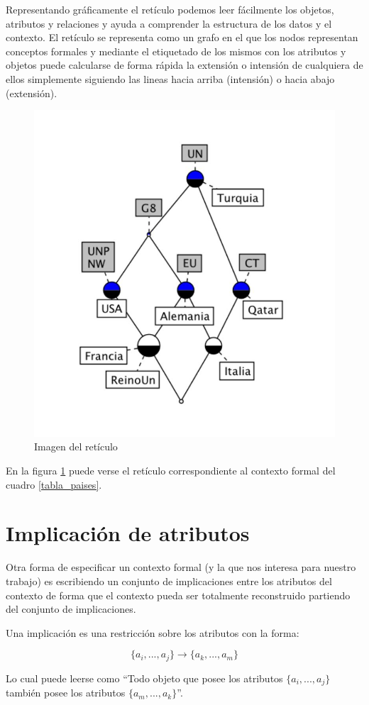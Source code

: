 	Representando gráficamente el retículo podemos leer fácilmente los objetos, atributos y relaciones y ayuda a comprender la estructura de los datos y el contexto. El retículo se representa como un grafo en el que los nodos representan conceptos formales y mediante el etiquetado de los mismos con los atributos y objetos puede calcularse de forma rápida la extensión o intensión de cualquiera de ellos simplemente siguiendo las lineas hacia arriba (intensión) o hacia abajo (extensión).
	
	\begin{figure}
		\centering
		\includegraphics[width=0.5\linewidth]{02_FCA/reticulo}
		\caption{Imagen del retículo}
		\label{reticulo}
	\end{figure}

	En la figura \ref{reticulo} puede verse el retículo correspondiente al contexto formal del cuadro \ref{tabla_paises}.
	
	
	
\section*{Implicación de atributos}

	Otra forma de especificar un contexto formal (y la que nos interesa para nuestro trabajo) es escribiendo un conjunto de implicaciones entre los atributos del contexto de forma que el contexto pueda ser totalmente reconstruido partiendo del conjunto de implicaciones.
	
	Una implicación es una restricción sobre los atributos con la forma: 
	
	\[ \{a_i,...,a_j\} \rightarrow \{a_k,...,a_m\} \]
	
	Lo cual puede leerse como ``Todo objeto que posee los atributos $\{a_i,...,a_j\}$ también posee los atributos $\{a_m,...,a_k\}$''.
	
